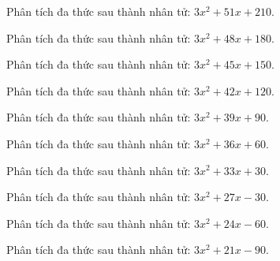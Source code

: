 \begin{bt}
	Phân tích đa thức sau thành nhân tử: $3 x^2 + 51 x + 210$.
\end{bt}
\begin{bt}
	Phân tích đa thức sau thành nhân tử: $3 x^2 + 48 x + 180$.
\end{bt}
\begin{bt}
	Phân tích đa thức sau thành nhân tử: $3 x^2 + 45 x + 150$.
\end{bt}
\begin{bt}
	Phân tích đa thức sau thành nhân tử: $3 x^2 + 42 x + 120$.
\end{bt}
\begin{bt}
	Phân tích đa thức sau thành nhân tử: $3 x^2 + 39 x + 90$.
\end{bt}
\begin{bt}
	Phân tích đa thức sau thành nhân tử: $3 x^2 + 36 x + 60$.
\end{bt}
\begin{bt}
	Phân tích đa thức sau thành nhân tử: $3 x^2 + 33 x + 30$.
\end{bt}
\begin{bt}
	Phân tích đa thức sau thành nhân tử: $3 x^2 + 27 x - 30$.
\end{bt}
\begin{bt}
	Phân tích đa thức sau thành nhân tử: $3 x^2 + 24 x - 60$.
\end{bt}
\begin{bt}
	Phân tích đa thức sau thành nhân tử: $3 x^2 + 21 x - 90$.
\end{bt}
